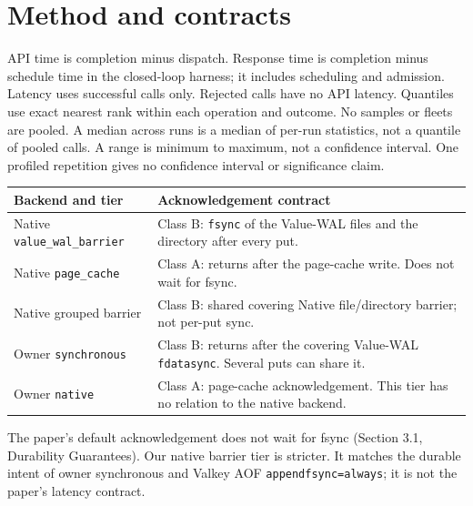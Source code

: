 \documentclass[10pt,a4paper]{article}
\begin{document}
\endgroup

\clearpage

\clearpage
\section{Method and contracts}\label{sec:method}
API time is completion minus dispatch. Response time is completion minus schedule time in the closed-loop harness; it includes scheduling and admission. Latency uses successful calls only. Rejected calls have no API latency. Quantiles use exact nearest rank within each operation and outcome. No samples or fleets are pooled. A median across runs is a median of per-run statistics, not a quantile of pooled calls. A range is minimum to maximum, not a confidence interval. One profiled repetition gives no confidence interval or significance claim.

\begin{center}\small
\begin{tabular}{lp{.68\linewidth}}\toprule
Backend and tier & Acknowledgement contract\\\midrule
Native \texttt{value\_wal\_barrier} & Class B: \texttt{fsync} of the Value-WAL files and the directory after every put.\\
Native \texttt{page\_cache} & Class A: returns after the page-cache write. Does not wait for fsync.\\
Native grouped barrier & Class B: shared covering Native file/directory barrier; not per-put sync.\\
Owner \texttt{synchronous} & Class B: returns after the covering Value-WAL \texttt{fdatasync}. Several puts can share it.\\
Owner \texttt{native} & Class A: page-cache acknowledgement. This tier has no relation to the native backend.\\\bottomrule
\end{tabular}
\end{center}
The paper's default acknowledgement does not wait for fsync (Section 3.1, Durability Guarantees). Our native barrier tier is stricter. It matches the durable intent of owner synchronous and Valkey AOF \texttt{appendfsync=always}; it is not the paper's latency contract.
\end{document}
